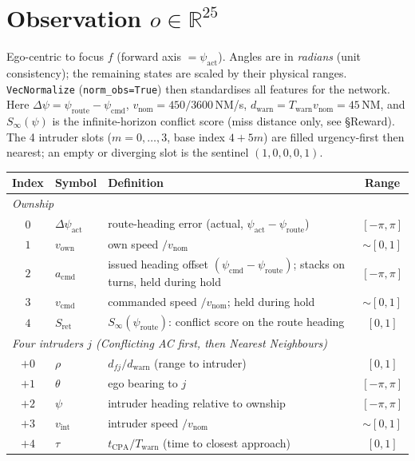 \documentclass[11pt, a4paper]{article}
\begin{document}
\section{Observation $o\in\mathbb R^{25}$}
Ego-centric to focus $f$ (forward axis $=\psi_\text{act}$). Angles are in \emph{radians}
(unit consistency); the remaining states are scaled by their physical ranges.
\texttt{VecNormalize} (\texttt{norm\_obs=True}) then standardises all features for the network.
Here $\Delta\psi=\psi_\text{route}-\psi_\text{cmd}$,
$v_\text{nom}=450/3600$\,NM/s, $d_\text{warn}=T_\text{warn}v_\text{nom}=45$\,NM, and
$S_\infty(\psi)$ is the infinite-horizon conflict score (miss distance only, see \S Reward).
The 4 intruder slots ($m=0,\dots,3$, base index $4+5m$) are filled urgency-first then nearest;
an empty or diverging slot is the sentinel $(1,0,0,0,1)$.
\begin{table}[h]\centering
\begin{tabular}{cllc}
\toprule
Index & Symbol & Definition & Range\\
\midrule
\multicolumn{4}{l}{\emph{Ownship}}\\
$0$ & $\Delta\psi_\text{act}$ & route-heading error (actual, $\psi_\text{act}-\psi_\text{route}$) & $[-\pi,\pi]$\\
$1$ & $v_\text{own}$ & own speed $/ v_\text{nom}$ & ${\sim}[0,1]$\\
$2$ & $a_\text{cmd}$ & issued heading offset $(\psi_\text{cmd}-\psi_\text{route})$; stacks on turns, held during hold & $[-\pi,\pi]$\\
$3$ & $v_\text{cmd}$ & commanded speed $/ v_\text{nom}$; held during hold & ${\sim}[0,1]$\\
$4$ & $S_\text{ret}$ & $S_\infty(\psi_\text{route})$: conflict score on the route heading & $[0,1]$\\
\multicolumn{4}{l}{\emph{Four intruders $j$ (Conflicting AC first, then Nearest Neighbours)}}\\
$+0$ & $\rho$ & $d_{fj}/d_\text{warn}$ (range to intruder) & $[0,1]$\\
$+1$ & $\theta$ & ego bearing to $j$ & $[-\pi,\pi]$\\
$+2$ & $\psi$ & intruder heading relative to ownship & $[-\pi,\pi]$\\
$+3$ & $v_\text{int}$ & intruder speed $/ v_\text{nom}$ & ${\sim}[0,1]$\\
$+4$ & $\tau$ & $t_\text{CPA}/T_\text{warn}$ (time to closest approach) & $[0,1]$\\
\bottomrule
\end{tabular}
\end{table}
\end{document}
